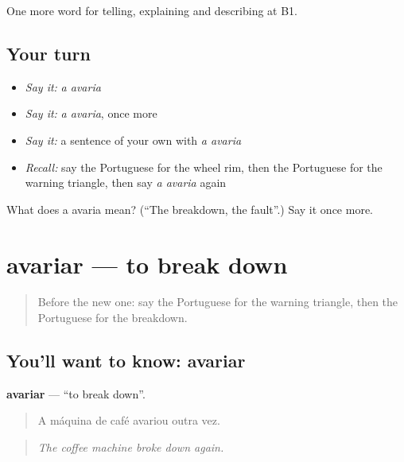 \begin{grammarlens}[title={What you've built}]
One more word for telling, explaining and describing at B1.
\end{grammarlens}

\subsection*{Your turn}
\begin{itemize}
\raggedright
  \item \emph{Say it:} \emph{a avaria}
  \item \emph{Say it:} \emph{a avaria}, once more
  \item \emph{Say it:} a sentence of your own with \emph{a avaria}
  \item \emph{Recall:} say the Portuguese for the wheel rim, then the Portuguese for the warning triangle, then say \emph{a avaria} again
\end{itemize}

\begin{tcolorbox}[breakable,colback=teal!4,colframe=teal!35!black,title={Before you move on}]
What does a avaria mean? (\textquotedblleft{}The breakdown, the fault\textquotedblright{}.) Say it once more.
\end{tcolorbox}
\section[avariar]{avariar — to break down}

\label{lesson:PT-C406-avariar}



\begin{quote}
Before the new one: say the Portuguese for the warning triangle, then the Portuguese for the breakdown.
\end{quote}

\subsection*{You'll want to know: avariar}
\textbf{avariar} — \textquotedblleft{}to break down\textquotedblright{}.

\begin{quote}
A máquina de café avariou outra vez.
\end{quote}

\begin{quote}
\emph{The coffee machine broke down again.}
\end{quote}

